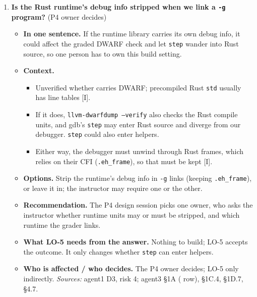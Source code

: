 \documentclass[10pt]{article}
\newcommand{\code}[1]{\texttt{\small #1}}
\newcommand{\mI}{\textsf{\scriptsize[I]}}
\newcommand{\field}[1]{\textbf{#1}\enspace}
\newcommand{\decitem}[1]{\needspace{6\baselineskip}\setcounter{enumi}{\numexpr#1-1\relax}\item}
\begin{document}
\begin{enumerate}[label=\textbf{\arabic*.},ref=\arabic*,leftmargin=1.8em,itemsep=0.8em]
\decitem{16}\label{dec:rtdebug}\textbf{Is the Rust runtime's debug info stripped when we link a \code{-g} program?} (P4 owner decides)
\begin{itemize}
\item[] \field{In one sentence.} If the runtime library carries its own debug info, it could affect the graded DWARF check and let \code{step} wander into Rust source, so one person has to own this build setting.
\item[] \field{Context.}
\begin{itemize}
\item Unverified whether  carries DWARF; precompiled Rust \code{std} usually has line tables \mI.
\item If it does, \code{llvm-dwarfdump --verify} also checks the Rust compile units, and gdb's \code{step} may enter Rust source and diverge from our debugger. \code{step} could also enter  helpers.
\item Either way, the debugger must unwind through Rust frames, which relies on their CFI (\code{.eh\_frame}), so that must be kept \mI.
\end{itemize}
\item[] \field{Options.} Strip the runtime's debug info in \code{-g} links (keeping \code{.eh\_frame}), or leave it in; the instructor may require one or the other.
\item[] \field{Recommendation.} The P4 design session picks one owner, who asks the instructor whether runtime units may or must be stripped, and which runtime the grader links.
\item[] \field{What LO-5 needs from the answer.} Nothing to build; LO-5 accepts the outcome. It only changes whether \code{step} can enter  helpers.
\item[] \field{Who is affected / who decides.} The P4 owner decides; LO-5 only indirectly. \emph{Sources:} agent1 D3, risk 4; agent3 §1A ( row), §1C.4, §1D.7, §4.7.
\end{itemize}


\end{enumerate}
\end{document}
